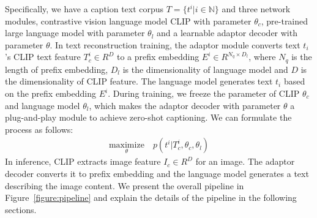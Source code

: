 Specifically, we have a caption text corpus $T=\{ t^i | i\in \mathbb{N} \}$ and three network modules, contrastive vision language model CLIP with parameter $\theta_{c}$, pre-trained large language model with parameter $\theta_{l}$ and a learnable adaptor decoder with parameter $\theta$. In text reconstruction training, the adaptor module converts text $t_i$'s CLIP text feature $T_c^{i} \in R^{D}$ to a prefix embedding $E^{i} \in R^{N_q \times D_l}$, where $N_q$ is the length of prefix embedding, $D_l$ is the dimensionality of language model and $D$ is the dimensionality of CLIP feature. The language model generates text $t_i$ based on the prefix embedding $E^{i}$. During training, we freeze the parameter of CLIP $\theta_{c}$ and language model $\theta_{l}$, which makes the adaptor decoder with parameter $\theta$ a plug-and-play module to achieve zero-shot captioning. 
We can formulate the process as follows:
\begin{align}
     \underset{\theta}{\mathrm{maximize}} \quad p(t^i|T_c^{i}, \theta_{c}, \theta_{l})
\end{align}
In inference, CLIP extracts image feature $I_c \in R^{D}$ for an image. The adaptor decoder converts it to prefix embedding and the language model generates a text describing the image content. We present the overall pipeline in Figure~\ref{figure:pipeline} and explain the details of the pipeline in the following sections.



